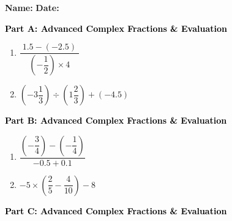 \documentclass[12pt, letterpaper, fleqn]{article}
\begin{document}
\textbf{Name:} \underline{\hspace{5cm}}
\hfill
\textbf{Date:} \underline{\hspace{3cm}}\\

\begin{tcolorbox}[colback=customteal!20]
\large\textcolor{black}{\textbf{Part A: Advanced Complex Fractions \& Evaluation}}
\end{tcolorbox}

\vspace{3mm}

\begin{enumerate}[itemsep=5.5cm, leftmargin=0.6cm]
\item $\dfrac{\;1.5 - (-2.5)\;}{\left(-\dfrac{1}{2}\right) \times 4}$
\item $\left( -3\dfrac{1}{3} \right) \div \left( 1\dfrac{2}{3} \right) + (-4.5)$
\end{enumerate}

\newpage

\begin{tcolorbox}[colback=customteal!20]
\large\textcolor{black}{\textbf{Part B: Advanced Complex Fractions \& Evaluation}}
\end{tcolorbox}

\vspace{3mm}

\begin{enumerate}[itemsep=5.5cm, leftmargin=0.6cm, resume]
\item $\dfrac{ \left(-\dfrac{3}{4}\right) - \left(-\dfrac{1}{4}\right) }{ -0.5 + 0.1 }$
\item $-5 \times \left( \dfrac{2}{5} - \dfrac{4}{10} \right) - 8$
\end{enumerate}

\newpage

\begin{tcolorbox}[colback=customteal!20]
\large\textcolor{black}{\textbf{Part C: Advanced Complex Fractions \& Evaluation}}
\end{tcolorbox}

\vspace{3mm}
\end{document}
